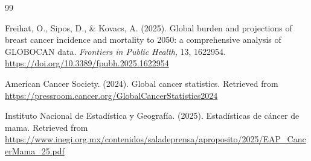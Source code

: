 \begin{thebibliography}{99}

    Freihat, O., Sipos, D., \& Kovacs, A. (2025). Global burden and projections of
    breast cancer incidence and mortality to 2050: a comprehensive analysis of
    GLOBOCAN data. \textit{Frontiers in Public Health}, 13, 1622954.
    \url{https://doi.org/10.3389/fpubh.2025.1622954}



    American Cancer Society. (2024). Global cancer statistics. Retrieved from
    \url{https://pressroom.cancer.org/GlobalCancerStatistics2024}


    Instituto Nacional de Estadística y Geografía. (2025). Estadísticas de cáncer de mama.
    Retrieved from \url{https://www.inegi.org.mx/contenidos/saladeprensa/aproposito/2025/EAP_CancerMama_25.pdf}


\end{thebibliography}
